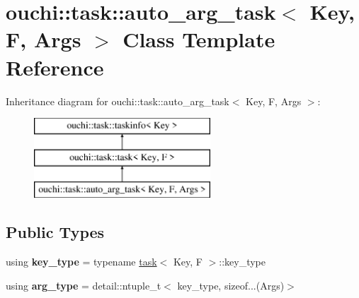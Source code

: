 \hypertarget{classouchi_1_1task_1_1auto__arg__task}{}\section{ouchi\+::task\+::auto\+\_\+arg\+\_\+task$<$ Key, F, Args $>$ Class Template Reference}
\label{classouchi_1_1task_1_1auto__arg__task}
Inheritance diagram for ouchi\+::task\+::auto\+\_\+arg\+\_\+task$<$ Key, F, Args $>$\+:\begin{figure}[H]
\begin{center}
\leavevmode
\includegraphics[height=3.000000cm]{classouchi_1_1task_1_1auto__arg__task}
\end{center}
\end{figure}
\subsection*{Public Types}
\begin{DoxyCompactItemize}
\item 
\mbox{\label{classouchi_1_1task_1_1auto__arg__task_a51261ad0f9bcc6fb3789a285cf6ffea7}} 
using {\bfseries key\+\_\+type} = typename \mbox{\hyperlink{classouchi_1_1task_1_1task}{task}}$<$ Key, F $>$\+::key\+\_\+type
\item 
\mbox{\label{classouchi_1_1task_1_1auto__arg__task_a62143af9c70aad698b49094e7e7b0942}} 
using {\bfseries arg\+\_\+type} = detail\+::ntuple\+\_\+t$<$ key\+\_\+type, sizeof...(Args)$>$
\end{DoxyCompactItemize}
